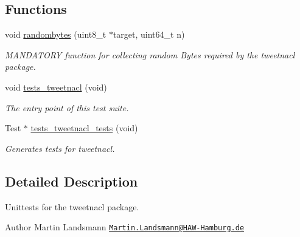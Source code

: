 \subsection*{Functions}
\begin{DoxyCompactItemize}
\item 
void \hyperlink{group__unittests_gad3aa6e3b3ad43afce8349ec384d40338}{randombytes} (uint8\+\_\+t $\ast$target, uint64\+\_\+t n)
\begin{DoxyCompactList}\small\item\em M\+A\+N\+D\+A\+T\+O\+RY function for collecting random Bytes required by the tweetnacl package. \end{DoxyCompactList}\item 
void \hyperlink{group__unittests_gaa48af13c9647d85886796d6c526776a1}{tests\+\_\+tweetnacl} (void)
\begin{DoxyCompactList}\small\item\em The entry point of this test suite. \end{DoxyCompactList}\item 
Test $\ast$ \hyperlink{group__unittests_ga9eef4348cd35bd34bac6ef153930eca1}{tests\+\_\+tweetnacl\+\_\+tests} (void)
\begin{DoxyCompactList}\small\item\em Generates tests for tweetnacl. \end{DoxyCompactList}\end{DoxyCompactItemize}


\subsection{Detailed Description}
Unittests for the {\ttfamily tweetnacl} package. 

\begin{DoxyAuthor}{Author}
Martin Landsmann \href{mailto:Martin.Landsmann@HAW-Hamburg.de}{\tt Martin.\+Landsmann@\+H\+A\+W-\/\+Hamburg.\+de} 
\end{DoxyAuthor}

